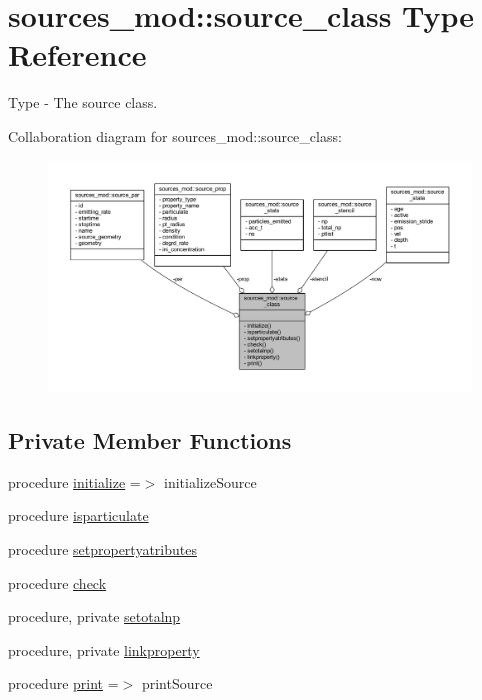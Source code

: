 \hypertarget{structsources__mod_1_1source__class}{}\section{sources\+\_\+mod\+:\+:source\+\_\+class Type Reference}
\label{structsources__mod_1_1source__class}


Type -\/ The source class.  




Collaboration diagram for sources\+\_\+mod\+:\+:source\+\_\+class\+:\nopagebreak
\begin{figure}[H]
\begin{center}
\leavevmode
\includegraphics[width=350pt]{structsources__mod_1_1source__class__coll__graph}
\end{center}
\end{figure}
\subsection*{Private Member Functions}
\begin{DoxyCompactItemize}
\item 
procedure \mbox{\hyperlink{structsources__mod_1_1source__class_a996650639d039c09d2b77a36473e977e}{initialize}} =$>$ initialize\+Source
\item 
procedure \mbox{\hyperlink{structsources__mod_1_1source__class_aa0577157bf75a525f9e1bde905500ab7}{isparticulate}}
\item 
procedure \mbox{\hyperlink{structsources__mod_1_1source__class_a1cdbd1115f420bf0bda21067940bcb58}{setpropertyatributes}}
\item 
procedure \mbox{\hyperlink{structsources__mod_1_1source__class_acbed40c917e4dacc0cd9dd7931e27839}{check}}
\item 
procedure, private \mbox{\hyperlink{structsources__mod_1_1source__class_a6098dbb749bed525919e6370aed70ef9}{setotalnp}}
\item 
procedure, private \mbox{\hyperlink{structsources__mod_1_1source__class_a58282637980cd13f683be32cb57dc227}{linkproperty}}
\item 
procedure \mbox{\hyperlink{structsources__mod_1_1source__class_af632299e6c5e29a7f2008417aa68d529}{print}} =$>$ print\+Source
\end{DoxyCompactItemize}
